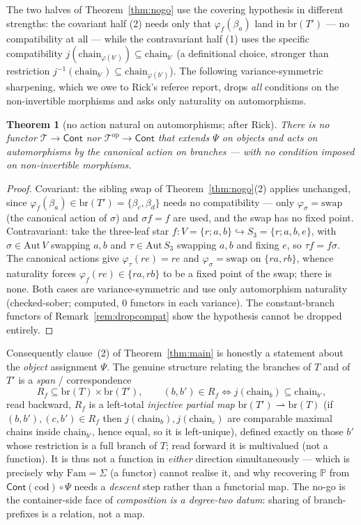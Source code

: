 \documentclass[11pt]{article}
\newtheorem{theorem}{Theorem}
\theoremstyle{definition}
\newcommand{\Cont}{\mathsf{Cont}}
\newcommand{\Fam}{\mathrm{Fam}}
\newcommand{\cod}{\mathrm{cod}}
\newcommand{\branches}{\mathrm{br}}
\newcommand{\op}{\mathrm{op}}
\newcommand{\Tree}{\mathcal{T}}
\newcommand{\Pfib}{\mathbb{P}}
\newcommand{\inpr}{\hookrightarrow}
\begin{document}
The two halves of Theorem~\ref{thm:nogo} use the covering hypothesis in different strengths: the
covariant half (2) needs only that $\varphi_f(\beta_a)$ land in $\branches(T')$ --- no compatibility
at all --- while the contravariant half (1) uses the specific compatibility
$j(\mathrm{chain}_{\varphi(b')})\subseteq\mathrm{chain}_{b'}$ (a definitional choice, stronger than
restriction $j^{-1}(\mathrm{chain}_{b'})\subseteq\mathrm{chain}_{\varphi(b')}$). The following
variance-symmetric sharpening, which we owe to Rick's referee report, drops \emph{all} conditions
on the non-invertible morphisms and asks only naturality on automorphisms.

\begin{theorem}[no action natural on automorphisms; after Rick]\label{thm:nogonat}
There is no functor $\Tree\to\Cont$ nor $\Tree^\op\to\Cont$ that extends $\Psi$ on objects and acts
on \emph{automorphisms} by the canonical action on branches --- with no condition imposed on
non-invertible morphisms.
\end{theorem}

\begin{proof}
Covariant: the sibling swap of Theorem~\ref{thm:nogo}(2) applies unchanged, since
$\varphi_f(\beta_a)\in\branches(T')=\{\beta_c,\beta_d\}$ needs no compatibility --- only
$\varphi_\sigma=\mathrm{swap}$ (the canonical action of $\sigma$) and $\sigma f=f$ are used, and the
swap has no fixed point. Contravariant: take the three-leaf star $f\colon V=\{r;a,b\}\inpr
S_3=\{r;a,b,e\}$, with $\sigma\in\mathrm{Aut}\,V$ swapping $a,b$ and $\tau\in\mathrm{Aut}\,S_3$ swapping $a,b$ and
fixing $e$, so $\tau f=f\sigma$. The canonical actions give $\varphi_\tau(re)=re$ and
$\varphi_\sigma=\mathrm{swap}$ on $\{ra,rb\}$, whence naturality forces $\varphi_f(re)\in\{ra,rb\}$
to be a fixed point of the swap; there is none. Both cases are variance-symmetric and use only
automorphism naturality (checked-sober; computed, $0$ functors in each variance). The
constant-branch functors of Remark~\ref{rem:dropcompat} show the hypothesis cannot be dropped
entirely.
\end{proof}

Consequently clause~(2) of Theorem~\ref{thm:main} is honestly a statement about the \emph{object}
assignment $\Psi$. The genuine structure relating the branches of $T$ and of $T'$ is a
\emph{span} / correspondence
\[
R_f\subseteq\branches(T)\times\branches(T'),\qquad
(b,b')\in R_f\iff j(\mathrm{chain}_b)\subseteq\mathrm{chain}_{b'},
\]
read backward, $R_f$ is a left-total \emph{injective partial map} $\branches(T')\rightharpoonup
\branches(T)$ (if $(b,b'),(c,b')\in R_f$ then $j(\mathrm{chain}_b),j(\mathrm{chain}_c)$ are
comparable maximal chains inside $\mathrm{chain}_{b'}$, hence equal, so it is left-unique), defined
exactly on those $b'$ whose restriction is a full branch of $T$; read forward it is multivalued (not
a function). It is thus not a function in \emph{either} direction simultaneously --- which is
precisely why $\Fam=\Sigma$ (a functor) cannot realise it, and why recovering $\Pfib$ from
$\Cont(\cod)\circ\Psi$ needs a \emph{descent} step rather than a functorial map. The no-go is the container-side face of
\emph{composition is a degree-two datum}: sharing of branch-prefixes is a relation, not a map.
\end{document}
